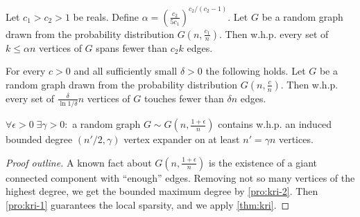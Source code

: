 \begin{proposition}
    \label{pro:kri-1}
    Let $c_1>c_2>1$ be reals. Define $\alpha=\left(\frac{c_2}{5c_1}\right)^{c_2/(c_2-1)}$.
    Let $G$ be a random graph drawn from the probability distribution $G\left(n,\frac{c_1}{n}\right)$.
    Then w.h.p. every set of $k\leq\alpha n$ vertices of $G$ spans fewer than $c_2k$ edges.
\end{proposition}

\begin{proposition}
    \label{pro:kri-2}
    For every $c>0$ and all sufficiently small $\delta>0$ the following holds.
    Let $G$ be a random graph drawn from the probability distribution $G\left(n,\frac{c}{n}\right)$.
    Then w.h.p. every set of $\frac{\delta}{\ln 1/\delta}n$ vertices of $G$ touches fewer than $\delta n$ edges.
\end{proposition}

\begin{theorem}
    \label{thm:kri-gnp}
    $\forall\epsilon>0\;\exists\gamma>0:$ a random graph $G\sim G\left(n,\frac{1+\epsilon}{n}\right)$
    contains w.h.p. an induced bounded degree $(n'/2,\gamma)$ vertex expander
    on at least $n'=\gamma n$ vertices.
\end{theorem}

\begin{proof}[Proof outline]
    A known fact about $G\left(n,\frac{1+\epsilon}{n}\right)$ is the existence of a giant connected component with ``enough'' edges.
    Removing not so many vertices of the highest degree, we get the bounded maximum degree by \autoref{pro:kri-2}.
    Then \autoref{pro:kri-1} guarantees the local sparsity, and we apply \autoref{thm:kri}.
\end{proof}
